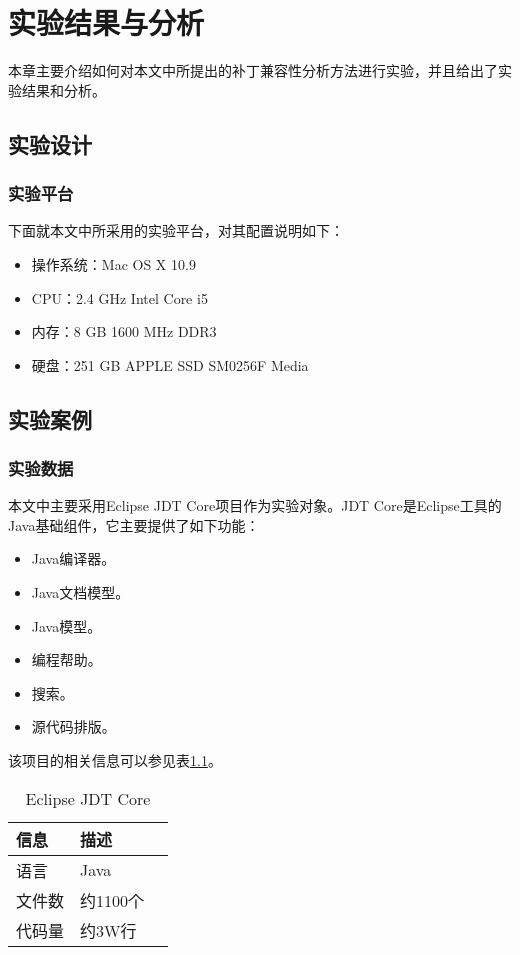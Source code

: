 \chapter{实验结果与分析}
\label {exp}
本章主要介绍如何对本文中所提出的补丁兼容性分析方法进行实验，并且给出了实验结果和分析。

\section{实验设计}

\subsection{实验平台}
下面就本文中所采用的实验平台，对其配置说明如下：
\begin{itemize}
	\item 操作系统：Mac OS X 10.9
	\item CPU：2.4 GHz Intel Core i5
	\item 内存：8 GB 1600 MHz DDR3
	\item 硬盘：251 GB APPLE SSD SM0256F Media
\end{itemize}

\section{实验案例}


\subsection{实验数据}

本文中主要采用Eclipse JDT Core项目作为实验对象。JDT Core是Eclipse工具的Java基础组件，它主要提供了如下功能：
\begin{itemize}
	\item Java编译器。
	\item Java文档模型。
	\item Java模型。
	\item 编程帮助。
	\item 搜索。
	\item 源代码排版。
\end{itemize}

该项目的相关信息可以参见表\ref {jdt_core}。

\begin{table}
	\caption{Eclipse JDT Core}
	\label{jdt_core}
	\centering
	\begin{tabular}{llc}
		\toprule[1.5pt]
		{\heiti 信息} & {\heiti 描述} \\\midrule[1pt]
		语言 & Java \\
		文件数 & 约1100个\\
		代码量 & 约3W行\\
		\bottomrule[1.5pt]
	\end{tabular}
\end{table}

